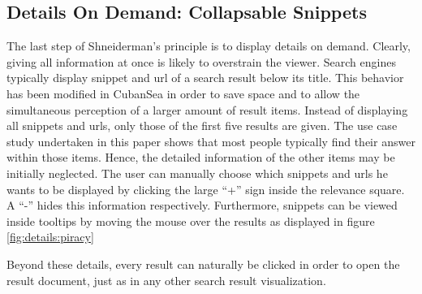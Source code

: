 \subsection{Details On Demand: Collapsable Snippets}
The last step of Shneiderman's principle is to display details on demand. Clearly, giving all information at once is likely to overstrain the viewer. Search engines typically display snippet and url of a search result below its title. This behavior has been modified in CubanSea in order to save space and to allow the simultaneous perception of a larger amount of result items. Instead of displaying all snippets and urls, only those of the first five results are given. The use case study undertaken in this paper shows that most people typically find their answer within those items. Hence, the detailed information of the other items may be initially neglected. The user can manually choose which snippets and urls he wants to be displayed by clicking the large ``+'' sign inside the relevance square. A ``-'' hides this information respectively. Furthermore, snippets can be viewed inside tooltips by moving the mouse over the results as displayed in figure \ref{fig:details:piracy}

Beyond these details, every result can naturally be clicked in order to open the result document, just as in any other search result visualization.
